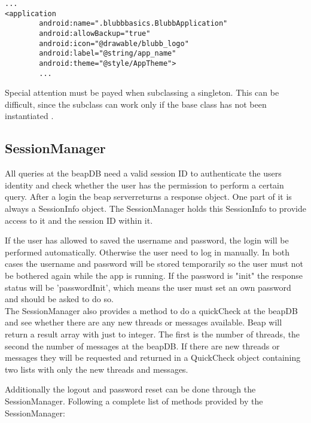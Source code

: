 \documentclass[12pt,a4paper,oneside]{report}
\newcommand{\beapDB}{beapDB}
\newcommand{\beapServer}{beap server}
\begin{document}
\lstset{language=xml}
\begin{lstlisting}[caption=Application tag of the manifest.xml, label=lst:AppTagManifest]
...
<application
        android:name=".blubbbasics.BlubbApplication"
        android:allowBackup="true"
        android:icon="@drawable/blubb_logo"
        android:label="@string/app_name"
        android:theme="@style/AppTheme">
        ...
\end{lstlisting}
\lstset{language=java}
Special attention must be payed when subclassing a singleton. This can be difficult, since the subclass can work only if the base class has not been instantiated \citep[p. 46]{cooper2000java}.

\subsection{SessionManager}
All queries at the beapDB need a valid session ID to authenticate the users identity and check whether the user has the permission to perform a certain query. After a login the \beapServer returns a response object. One part of it is always a SessionInfo object. The SessionManager holds this SessionInfo to provide access to it and the session ID within it.

If the user has allowed to saved the username and password, the login will be performed automatically. Otherwise the user need to log in manually. In both cases the username and password will be stored temporarily so the user must not be bothered again while the app is running. 
If the password is "init" the response status will be 'passwordInit', which means the user must set an own password and should be asked to do so. \\

The SessionManager also provides a method to do a quickCheck at the \beapDB{} and see whether there are any new threads or messages available. Beap will return a result array with just to integer. The first is the number of threads, the second the number of messages at the \beapDB{}. If there are new threads or messages they will be requested and returned in a QuickCheck object containing two lists with only the new threads and messages.


Additionally the logout and password reset can be done through the SessionManager.
Following a complete list of methods provided by the SessionManager:
\end{document}
